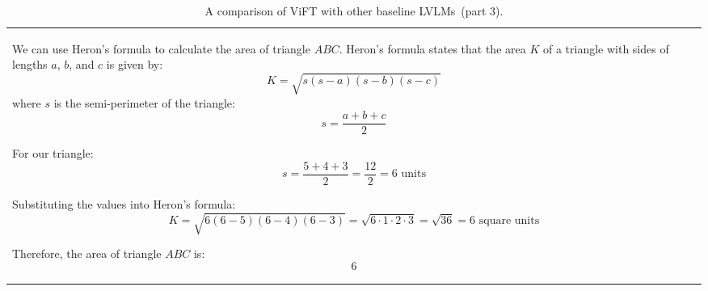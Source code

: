 \begin{table*}[htbp]
\begin{tabular}{p{14cm}}
\begin{tcolorbox}[colback=gray!5, colframe=gray!40, sharp corners, width=\linewidth, boxrule=0.5mm]
We can use Heron's formula to calculate the area of triangle \(ABC\). Heron's formula states that the area \(K\) of a triangle with sides of lengths \(a\), \(b\), and \(c\) is given by:
\[
K = \sqrt{s(s-a)(s-b)(s-c)}
\]
where \(s\) is the semi-perimeter of the triangle:
\[
s = \frac{a + b + c}{2}
\]

For our triangle:
\[
s = \frac{5 + 4 + 3}{2} = \frac{12}{2} = 6 \text{ units}
\]

Substituting the values into Heron's formula:
\[
K = \sqrt{6(6-5)(6-4)(6-3)} = \sqrt{6 \cdot 1 \cdot 2 \cdot 3} = \sqrt{36} = 6 \text{ square units}
\]

Therefore, the area of triangle \(ABC\) is:
\[
\boxed{6}
\]

\end{tcolorbox}
\end{tabular}
\caption{A comparison of ViFT with other baseline LVLMs~(part 3).}
\end{table*}



